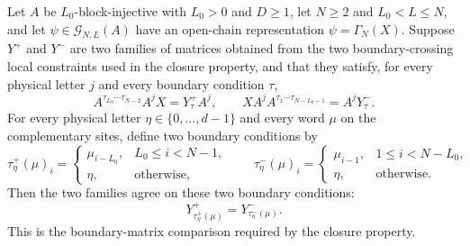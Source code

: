 \begin{theorem}
    \label{thm:wrapped_mirror_witness_agree_chain_ground_space}
    \leanok
    Let $A$ be $L_0$-block-injective with $L_0>0$ and $D\ge1$, let $N\ge2$
    and $L_0<L\le N$, and let
    $\psi\in\mathcal G_{N,L}(A)$ have an open-chain representation
    $\psi=\Gamma_N(X)$.  Suppose $Y^{+}$ and $Y^{-}$ are two families of
    matrices obtained from the two boundary-crossing local constraints used
    in the closure property, and that they satisfy,
    for every physical letter $j$ and every boundary condition $\tau$,
    \[
        A^{\tau_{L_0}\cdots\tau_{N-2}} A^j X
        =
        Y^{+}_{\tau} A^j,
        \qquad
        X A^j A^{\tau_1\cdots\tau_{N-L_0-1}}
        =
        A^j Y^{-}_{\tau}.
    \]
    For every physical letter
    $\eta\in\{0,\ldots,d-1\}$ and every word $\mu$ on the complementary sites,
    define two boundary conditions by
    \[
        \tau^{+}_{\eta}(\mu)_i =
        \begin{cases}
            \mu_{i-L_0}, & L_0\le i<N-1,     \\
            \eta,        & \text{otherwise},
        \end{cases}
        \qquad
        \tau^{-}_{\eta}(\mu)_i =
        \begin{cases}
            \mu_{i-1}, & 1\le i<N-L_0,     \\
            \eta,      & \text{otherwise}.
        \end{cases}
    \]
    Then the two families agree on these two boundary conditions:
    \[
        Y^{+}_{\tau^{+}_{\eta}(\mu)}
        =
        Y^{-}_{\tau^{-}_{\eta}(\mu)}.
    \]
    This is the boundary-matrix comparison required by the closure property.
\end{theorem}

